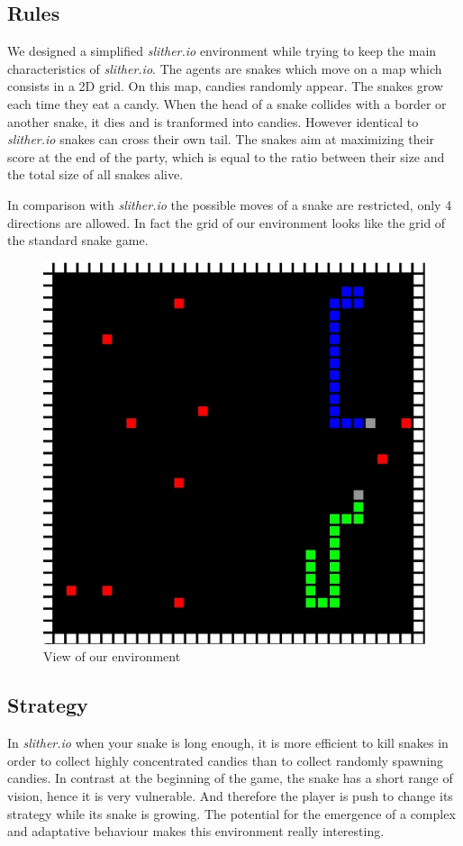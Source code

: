 \documentclass[journal, a4paper]{IEEEtran}
\begin{document}
\subsection{Rules}
We designed a simplified \emph{slither.io} environment while trying to keep the main characteristics of \emph{slither.io}. The agents are snakes which move on a map which consists in a 2D grid. On this map, candies randomly appear. The snakes grow each time they eat a candy. When the head of a snake collides with a border or another snake, it dies and is tranformed into candies. However identical to \emph{slither.io} snakes can cross their own tail. The snakes aim at maximizing their score at the end of the party, which is equal to the ratio between their size and the total size of all snakes alive.

In comparison with \emph{slither.io} the possible moves of a snake are restricted, only 4 directions are allowed. In fact the grid of our environment looks like the grid of the standard snake game. 
\begin{figure}[h]
	\centering
    \includegraphics[width=0.95\columnwidth]{images/environment.pdf}
    \caption{\label{environment}View of our environment}
\end{figure}


\subsection{Strategy}
In \emph{slither.io} when your snake is long enough, it is more efficient to kill snakes in order to collect highly concentrated candies than to collect randomly spawning candies. In contrast at the beginning of the game, the snake has a short range of vision, hence it is very vulnerable. And therefore the player is push to change its strategy while its snake is growing. The potential for the emergence of a complex and adaptative behaviour makes this environment really interesting.
\end{document}
